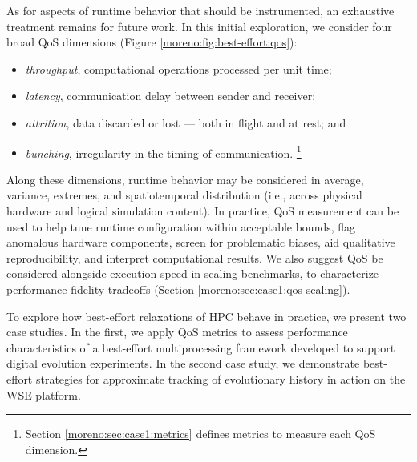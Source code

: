 As for aspects of runtime behavior that should be instrumented, an exhaustive treatment remains for future work.
In this initial exploration, we consider four broad QoS dimensions (Figure \ref{moreno:fig:best-effort:qos}):
\begin{itemize}
  \item \textit{throughput}, computational operations processed per unit time;
  \item \textit{latency}, communication delay between sender and receiver;
  \item \textit{attrition}, data discarded or lost --- both in flight and at rest; and
  \item \textit{bunching}, irregularity in the timing of communication.
  \unskip\footnote{%
  Section \ref{moreno:sec:case1:metrics} defines metrics to measure each QoS dimension.
  }
\end{itemize}

Along these dimensions, runtime behavior may be considered in average, variance, extremes, and spatiotemporal distribution (i.e., across physical hardware and logical simulation content).
In practice, QoS measurement can be used to help tune runtime configuration within acceptable bounds, flag anomalous hardware components, screen for problematic biases, aid qualitative reproducibility, and interpret computational results.
We also suggest QoS be considered alongside execution speed in scaling benchmarks, to characterize performance-fidelity tradeoffs (Section \ref{moreno:sec:case1:qos-scaling}).

To explore how best-effort relaxations of HPC behave in practice, we present two case studies.
In the first, we apply QoS metrics to assess performance characteristics of a best-effort multiprocessing framework developed to support digital evolution experiments.
In the second case study, we demonstrate best-effort strategies for approximate tracking of evolutionary history in action on the WSE platform.



